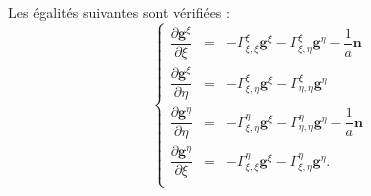 \begin{proposition}
\label{prop:christoffel_der}
Les égalités suivantes sont vérifiées :
\begin{equation}
\left\lbrace
\begin{array}{rcl}
\dfrac{\partial \mathbf{g}^{\xi}}{\partial \xi} & = & - \Gamma_{\xi, \xi}^{\xi} \mathbf{g}^{\xi} - \Gamma_{\xi, \eta}^{\xi} \mathbf{g}^{\eta}- \dfrac{1}{a} \mathbf{n}\\

\dfrac{\partial \mathbf{g}^{\xi}}{\partial \eta} & = & - \Gamma_{\xi, \eta}^{\xi} \mathbf{g}^{\xi} - \Gamma_{\eta, \eta}^{\xi} \mathbf{g}^{\eta}\\

\dfrac{\partial \mathbf{g}^{\eta}}{\partial \eta} & = & - \Gamma_{\xi, \eta}^{\eta} \mathbf{g}^{\xi} - \Gamma_{\eta, \eta}^{\eta} \mathbf{g}^{\eta}- \dfrac{1}{a} \mathbf{n}\\

\dfrac{\partial \mathbf{g}^{\eta}}{\partial \xi} & = & - \Gamma_{\xi, \xi}^{\eta} \mathbf{g}^{\xi} - \Gamma_{\xi, \eta}^{\eta} \mathbf{g}^{\eta}.\\
\end{array}
\right.
\end{equation}
\end{proposition}


